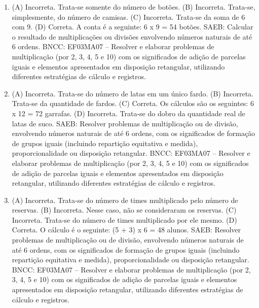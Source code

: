 \begin{enumerate}
\item
(A) Incorreta. Trata-se somente do número de botões.
(B) Incorreta. Trata-se, simplesmente, do número de camisas.
(C) Incorreta. Trata-se da soma de 6 com 9.
(D) Correta. A conta é a seguinte: 6 x 9 = 54 botões.
SAEB: Calcular o resultado de multiplicações ou divisões envolvendo números naturais de até 6 ordens.
BNCC: EF03MA07 – Resolver e elaborar problemas de multiplicação (por 2, 3, 4, 5 e 10) com os
significados de adição de parcelas iguais e elementos apresentados em disposição retangular,
utilizando diferentes estratégias de cálculo e registros.

\item
(A) Incorreta. Trata-se do número de latas em um único fardo.
(B) Incorreta. Trata-se da quantidade de fardos.
(C) Correta. Os cálculos são os seguintes: 6 x 12 = 72 garrafas.
(D) Incorreta. Trata-se do dobro da quantidade real de latas de suco.
SAEB: Resolver problemas de multiplicação ou de divisão, envolvendo números naturais de até 6 ordens, com os significados de formação de grupos iguais (incluindo repartição equitativa e medida), proporcionalidade ou disposição retangular.
BNCC: EF03MA07 – Resolver e elaborar problemas de multiplicação (por 2, 3, 4, 5 e 10) com os
significados de adição de parcelas iguais e elementos apresentados em disposição retangular,
utilizando diferentes estratégias de cálculo e registros.

\item
(A) Incorreta. Trata-se do número de times multiplicado pelo número de reservas.
(B) Incorreta. Nesse caso, não se consideraram os reservas.
(C) Incorreta. Trata-se do número de times multiplicado por ele mesmo.
(D) Correta. O cálculo é o seguinte: (5 + 3) x 6 = 48 alunos.
SAEB: Resolver problemas de multiplicação ou de divisão, envolvendo números naturais de até 6 ordens, com os significados de formação de grupos iguais (incluindo repartição equitativa e medida), proporcionalidade ou disposição retangular.
BNCC: EF03MA07 – Resolver e elaborar problemas de multiplicação (por 2, 3, 4, 5 e 10) com os
significados de adição de parcelas iguais e elementos apresentados em disposição retangular,
utilizando diferentes estratégias de cálculo e registros.
\end{enumerate}



